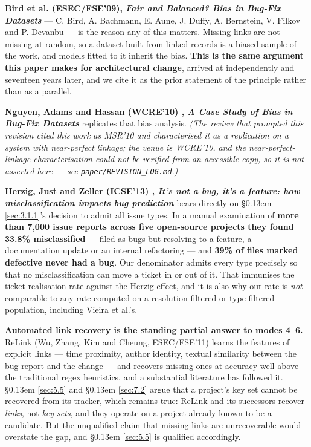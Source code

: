 \documentclass[11pt,a4paper]{article}
\begin{document}
\textbf{Bird et al. (ESEC/FSE'09), \emph{Fair and Balanced? Bias in Bug-Fix Datasets}} \cite{bird2009fair} --- C. Bird, A. Bachmann, E. Aune, J. Duffy, A. Bernstein, V. Filkov and P. Devanbu --- is the reason any of this matters. Missing links are not missing at random, so a dataset built from linked records is a biased sample of the work, and models fitted to it inherit the bias. \textbf{This is the same argument this paper makes for architectural change}, arrived at independently and seventeen years later, and we cite it as the prior statement of the principle rather than as a parallel.

\textbf{Nguyen, Adams and Hassan (WCRE'10) \cite{nguyen2010case}, \emph{A Case Study of Bias in Bug-Fix Datasets}} replicates that bias analysis. \emph{(The review that prompted this revision cited this work as MSR'10 and characterised it as a replication on a system with near-perfect linkage; the venue is WCRE'10, and the near-perfect-linkage characterisation could not be verified from an accessible copy, so it is not asserted here --- see \texttt{paper/\allowbreak{}REVISION\_\allowbreak{}LOG.\allowbreak{}md}.)}

\textbf{Herzig, Just and Zeller (ICSE'13) \cite{herzig2013not}, \emph{It's not a bug, it's a feature: how misclassification impacts bug prediction}} bears directly on \S\kern0.13em \ref{sec:3.1.1}'s decision to admit all issue types. In a manual examination of \textbf{more than 7,000 issue reports across five open-source projects they found 33.8\% misclassified} --- filed as bugs but resolving to a feature, a documentation update or an internal refactoring --- and \textbf{39\% of files marked defective never had a bug}. Our denominator admits every type precisely so that no misclassification can move a ticket in or out of it. That immunises the ticket realisation rate against the Herzig effect, and it is also why our rate is \emph{not} comparable to any rate computed on a resolution-filtered or type-filtered population, including Vieira et al.'s.

\textbf{Automated link recovery is the standing partial answer to modes 4--6.} ReLink \cite{wu2011relink} (Wu, Zhang, Kim and Cheung, ESEC/FSE'11) learns the features of explicit links --- time proximity, author identity, textual similarity between the bug report and the change --- and recovers missing ones at accuracy well above the traditional regex heuristics, and a substantial literature has followed it. \S\kern0.13em \ref{sec:5.5} and \S\kern0.13em \ref{sec:7.2} argue that a project's key set cannot be recovered from its tracker, which remains true: ReLink and its successors recover \emph{links}, not \emph{key sets}, and they operate on a project already known to be a candidate. But the unqualified claim that missing links are unrecoverable would overstate the gap, and \S\kern0.13em \ref{sec:5.5} is qualified accordingly.
\end{document}
